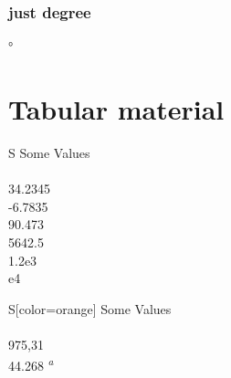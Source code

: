 \documentclass{article}
\begin{document}
\subsubsection{just degree}

\si{\degree}

\section{Tabular material}


\begin{table}[H]
\caption{Standard behaviour of the \texttt{S} column type.}
\label{tab:S:standard}
\centering
\begin{tabular}{S}
\toprule
{Some Values} \\
 \\
34.2345 \\
-6.7835 \\
90.473 \\
5642.5 \\
1.2e3 \\
e4 \\
\bottomrule
\end{tabular}
\end{table}





\begin{table}[H]
\caption{Detection of surrounding material in an \texttt{S} column.}
\label{tab:S:extras}
\centering
\begin{tabular}{S[color=orange]}
\toprule
{Some Values} \\
 \\
\color{purple} 975,31 \\
44.268 \textsuperscript{\emph{a}} \\
\bottomrule
\end{tabular}
\end{table}
\end{document}
